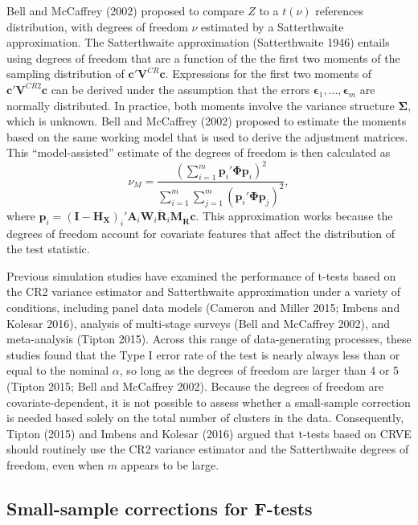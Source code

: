 \documentclass[12pt]{article}
\begin{document}
Bell and McCaffrey (2002) proposed to compare \(Z\) to a \(t(\nu)\)
references distribution, with degrees of freedom \(\nu\) estimated by a
Satterthwaite approximation. The Satterthwaite approximation
(Satterthwaite 1946) entails using degrees of freedom that are a
function of the the first two moments of the sampling distribution of
\(\mathbf{c}' \mathbf{V}^{CR} \mathbf{c}\). Expressions for the first
two moments of \(\mathbf{c}'\mathbf{V}^{CR2}\mathbf{c}\) can be derived
under the assumption that the errors
\(\boldsymbol\epsilon_1,...,\boldsymbol\epsilon_m\) are normally
distributed. In practice, both moments involve the variance structure
\(\boldsymbol\Sigma\), which is unknown. Bell and McCaffrey (2002)
proposed to estimate the moments based on the same working model that is
used to derive the adjustment matrices. This ``model-assisted'' estimate
of the degrees of freedom is then calculated as \begin{equation}
\label{eq:nu_model}
\nu_{M} = \frac{\left(\sum_{i=1}^m \mathbf{p}_i' \boldsymbol\Phi \mathbf{p}_i\right)^2}{\sum_{i=1}^m \sum_{j=1}^m \left(\mathbf{p}_i' \boldsymbol\Phi \mathbf{p}_j\right)^2},
\end{equation} where
\(\mathbf{p}_i = \left(\mathbf{I} - \mathbf{H_X}\right)_i'\mathbf{A}_i \mathbf{W}_i\mathbf{\ddot{R}}_i\mathbf{M_{\ddot{R}}} \mathbf{c}\).
This approximation works because the degrees of freedom account for
covariate features that affect the distribution of the test statistic.

Previous simulation studies have examined the performance of t-tests
based on the CR2 variance estimator and Satterthwaite approximation
under a variety of conditions, including panel data models (Cameron and
Miller 2015; Imbens and Kolesar 2016), analysis of multi-stage surveys
(Bell and McCaffrey 2002), and meta-analysis (Tipton 2015). Across this
range of data-generating processes, these studies found that the Type I
error rate of the test is nearly always less than or equal to the
nominal \(\alpha\), so long as the degrees of freedom are larger than 4
or 5 (Tipton 2015; Bell and McCaffrey 2002). Because the degrees of
freedom are covariate-dependent, it is not possible to assess whether a
small-sample correction is needed based solely on the total number of
clusters in the data. Consequently, Tipton (2015) and Imbens and Kolesar
(2016) argued that t-tests based on CRVE should routinely use the CR2
variance estimator and the Satterthwaite degrees of freedom, even when
\(m\) appears to be large.

\hypertarget{subsec:F-tests}{%
\subsection{Small-sample corrections for F-tests}\label{subsec:F-tests}}
\end{document}
